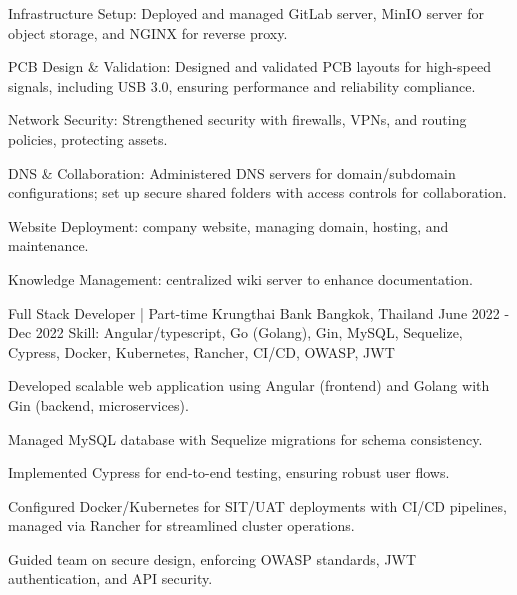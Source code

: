 \begin{cventries}
{\begin{cvitems}
      \item {Infrastructure Setup: Deployed and managed GitLab server, MinIO server for object storage, and NGINX for reverse proxy.}
      \item {PCB Design \& Validation: Designed and validated PCB layouts for high-speed signals, including USB 3.0, ensuring performance and reliability compliance.}
      \item {Network Security: Strengthened security with firewalls, VPNs, and routing policies, protecting assets.}
      \item {DNS \& Collaboration: Administered DNS servers for domain/subdomain configurations; set up secure shared folders with access controls for collaboration.}
      \item {Website Deployment: company website, managing domain, hosting, and maintenance.}
      \item {Knowledge Management: centralized wiki server to enhance documentation.}
      \end{cvitems}
    }

  \cventry
    {Full Stack Developer | Part-time} %
    {Krungthai Bank} %
    {Bangkok, Thailand} %
    {June 2022 - Dec 2022} %
    {Skill: Angular/typescript, Go (Golang), Gin, MySQL, Sequelize, Cypress, Docker, Kubernetes, Rancher, CI/CD, OWASP, JWT} %
    {
    \begin{cvitems} %
      \item {Developed scalable web application using Angular (frontend) and Golang with Gin (backend, microservices).}
      \item {Managed MySQL database with Sequelize migrations for schema consistency.}
      \item {Implemented Cypress for end-to-end testing, ensuring robust user flows.}
      \item {Configured Docker/Kubernetes for SIT/UAT deployments with CI/CD pipelines, managed via Rancher for streamlined cluster operations.}
      \item {Guided team on secure design, enforcing OWASP standards, JWT authentication, and API security.}
    \end{cvitems}
  }


\end{cventries}
